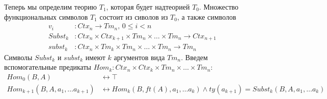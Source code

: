 \documentclass{amsart}
\theoremstyle{definition}
\theoremstyle{remark}
\numberwithin{figure}{section}
\begin{document}
Теперь мы определим теорию $T_1$, которая будет надтеорией $T_0$.
Множество функциональных символов $T_1$ состоит из сиволов из $T_0$, а также символов
\begin{align*}
v_i     & : Ctx_n \to Tm_n \text{, } 0 \leq i < n \\
Subst_k & : Ctx_n \times Ctx_{k+1} \times Tm_n \times \ldots \times Tm_n \to Ctx_{n+1} \\
subst_k & : Ctx_n \times Tm_k \times Tm_n \times \ldots \times Tm_n \to Tm_n
\end{align*}
Символы $Subst_k$ и $subst_k$ имеют $k$ аргументов вида $Tm_n$.
Введем вспомогательные предикаты $Hom_k : Ctx_n \times Ctx_k \times Tm_n \times \ldots \times Tm_n$:
\begin{align*}
Hom_0(B, A) & \leftrightarrow \top \\
Hom_{k+1}(B, A, a_1, \ldots a_{k+1}) & \leftrightarrow Hom_k(B, ft(A), a_1, \ldots a_k) \land ty(a_{k+1}) = Subst_k(B, A, a_1, \ldots a_k) \\
\end{align*}
\end{document}
